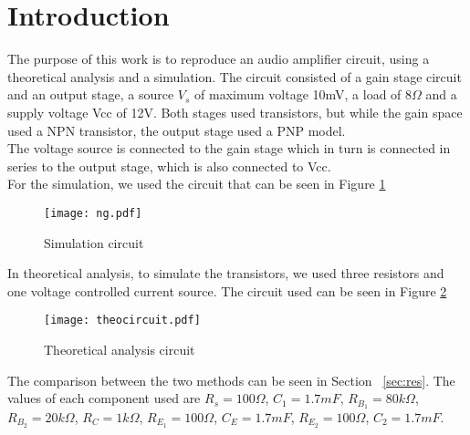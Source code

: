 \section{Introduction}
The purpose of this work is to reproduce an audio amplifier circuit, using a theoretical analysis and a simulation. The circuit consisted of a gain stage circuit and an output stage, a source $V_s$ of maximum voltage 10mV, a load of 8$\Omega$ and a supply voltage Vcc of 12V. Both stages used transistors, but while the gain space used a NPN transistor, the output stage used a PNP model.\\
The voltage source is connected to the gain stage which in turn is connected in series to the output stage, which is also connected to Vcc.\\
For the simulation, we used the circuit that can be seen in Figure \ref{fig:circngspice}
\begin{figure}[H] \centering
\texttt{[image: ng.pdf]}
\caption{Simulation circuit}
\label{fig:circngspice}
\end{figure} 
In theoretical analysis, to simulate the transistors, we used three resistors and one voltage controlled current source. The circuit used can be seen in Figure \ref{fig:circoc}

\begin{figure}[H] \centering
\texttt{[image: theocircuit.pdf]}
\caption{Theoretical analysis circuit}
\label{fig:circoc}
\end{figure} 
The comparison between the two methods can be seen in Section ~\ref{sec:res}.
The values of each component used are $R_s=100\Omega$, $C_1=1.7 mF$, $R_{B_1}=80k\Omega$, $R_{B_2}=20k\Omega$, $R_C=1k\Omega$, $R_{E_1}=100\Omega$, $C_E=1.7 mF$, $R_{E_2}=100\Omega$, $C_{2}=1.7mF$.

